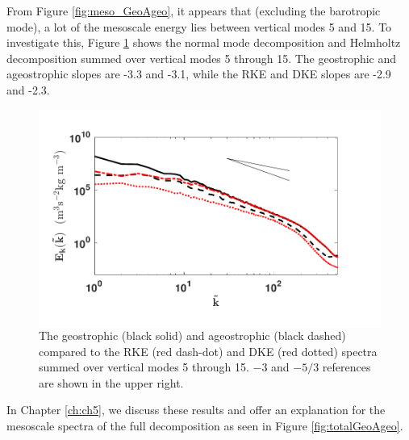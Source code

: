 From  Figure \ref{fig:meso_GeoAgeo}, it appears that (excluding the barotropic mode), a lot of the mesoscale energy lies between vertical modes 5 and 15. To investigate this,  Figure \ref{fig:meso_RKEDKE} shows the normal mode decomposition and Helmholtz decomposition summed over vertical modes 5 through 15. The geostrophic and ageostrophic slopes are -3.3 and -3.1, while the RKE and DKE slopes are -2.9 and -2.3.\\

\begin{figure}[H]
\includegraphics[scale=1]{Chapter4/img/meso_RKEDKE}
\caption{The geostrophic (black solid) and ageostrophic (black dashed) compared to the RKE (red dash-dot) and DKE (red dotted) spectra summed over vertical modes 5 through 15. $-3$ and $-5/3$ references are shown in the upper right.}
\label{fig:meso_RKEDKE}
\end{figure}

In Chapter \ref{ch:ch5}, we discuss these results and offer an explanation for the mesoscale spectra of the full decomposition as seen in Figure \ref{fig:totalGeoAgeo}.